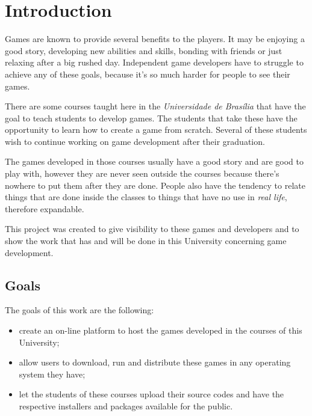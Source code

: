 \chapter*[Introduction]{Introduction}

Games are known to provide several benefits to the players. It may be enjoying a good story, developing new abilities and skills, bonding with friends or just relaxing after a big rushed day. Independent game developers have to struggle to achieve any of these goals, because it's so much harder for people to see their games.

There are some courses taught here in the \textit{Universidade de Bras\'ilia} that have the goal to teach students to develop games. The students that take these have the opportunity to learn how to create a game from scratch. Several of these students wish to continue working on game development after their graduation.

The games developed in those courses usually have a good story and are good to play with, however they are never seen outside the courses because there's nowhere to put them after they are done. People also have the tendency to relate things that are done inside the classes to things that have no use in \textit{real life}, therefore expandable.

This project was created to give visibility to these games and developers and to show the work that has and will be done in this University concerning game development.

\section*{Goals}

The goals of this work are the following:

\begin{itemize}
\item create an on-line platform to host the games developed in the courses of this University;
\item allow users to download, run and distribute these games in any operating system they have;
\item let the students of these courses upload their source codes and have the respective installers and packages available for the public.
\end{itemize}